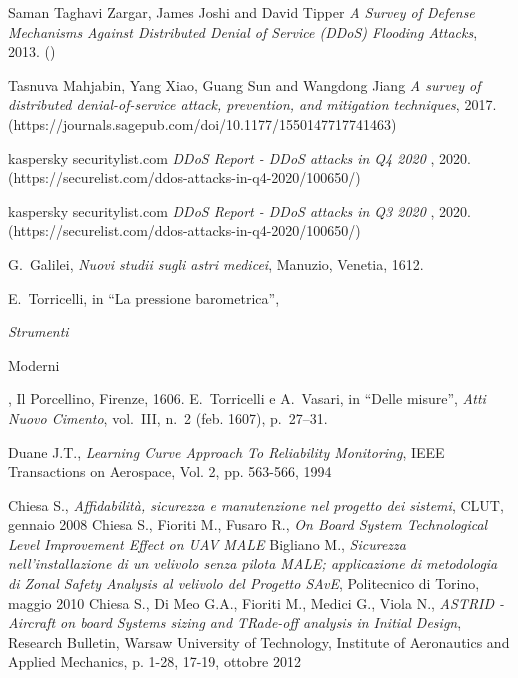 \begin{thebibliography}{9}
     Saman Taghavi Zargar, James Joshi and David Tipper {\em A Survey of Defense Mechanisms Against Distributed Denial of Service (DDoS) Flooding Attacks}, 2013. ()

     Tasnuva Mahjabin, Yang Xiao, Guang Sun and Wangdong Jiang {\em A survey of distributed denial-of-service attack, prevention, and mitigation techniques}, 2017. (https://journals.sagepub.com/doi/10.1177/1550147717741463)

     kaspersky securitylist.com {\em DDoS Report - DDoS attacks in Q4 2020
    }, 2020. (https://securelist.com/ddos-attacks-in-q4-2020/100650/)
    
     kaspersky securitylist.com {\em DDoS Report - DDoS attacks in Q3 2020
    }, 2020. (https://securelist.com/ddos-attacks-in-q4-2020/100650/)

     G.~Galilei, {\em Nuovi studii sugli astri medicei}, Manuzio, Venetia, 1612.

     E.~Torricelli, in ``La pressione barometrica'', {\em Strumenti

            Moderni}, Il Porcellino, Firenze, 1606.
     E.~Torricelli e A.~Vasari, in ``Delle misure'', {\em Atti Nuovo
            Cimento}, vol.~III, n.~2 (feb. 1607), p.~27--31.

     Duane J.T., \emph{Learning Curve Approach To Reliability Monitoring}, IEEE Transactions on Aerospace, Vol. 2, pp. 563-566, 1994


     Chiesa S., \emph{Affidabilità, sicurezza e manutenzione
        nel progetto dei sistemi}, CLUT, gennaio 2008
    Chiesa S., Fioriti M., Fusaro R., \emph{On Board System
        Technological  Level Improvement Effect on UAV MALE}
     Bigliano M., \emph{Sicurezza nell'installazione di un velivolo
        senza pilota MALE; applicazione di metodologia di Zonal Safety
        Analysis al velivolo del Progetto SAvE}, Politecnico di Torino,
    maggio 2010
     Chiesa S., Di Meo G.A., Fioriti M., Medici G., Viola N.,
    \emph{ASTRID - Aircraft on board Systems sizing and TRade-off
        analysis in Initial Design}, Research Bulletin, Warsaw University
    of Technology, Institute of Aeronautics and Applied Mechanics,
    p. 1-28, 17-19, ottobre 2012

\end{thebibliography}
